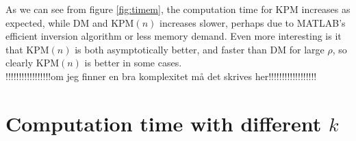 As we can see from figure \ref{fig:timem}, the computation time for KPM increases as expected, while DM and KPM$(n)$ increases slower, perhaps due to MATLAB's efficient inversion algorithm or less memory demand. 
Even more interesting is it that KPM$(n)$ is both asymptotically better, and faster than DM for large $\rho$, so clearly KPM$(n)$ is better in some cases.
\\!!!!!!!!!!!!!!!!!om jeg finner en bra komplexitet må det skrives her!!!!!!!!!!!!!!!!!!\\
\section{Computation time with different $k$} \label{sec:stimek}
